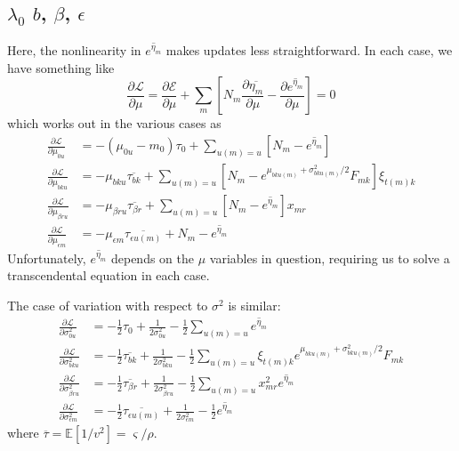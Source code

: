 \documentclass[11pt]{article}
\begin{document}
\subsection{$\lambda_0$ $b$, $\beta$, $\epsilon$}
Here, the nonlinearity in $\overline{e^{\eta_m}}$ makes updates less straightforward. In each case, we have something like
\begin{equation}
    \frac{\partial\mathcal{L}}{\partial \mu} = \frac{\partial\mathcal{E}}{\partial \mu} + \sum_{m} \left[N_{m} \frac{\partial\overline{\eta_{m}}}{\partial \mu} - \frac{\partial\overline{e^{\eta_{m}}}}{\partial \mu}\right] = 0
\end{equation}
which works out in the various cases as
\begin{align}
    \frac{\partial\mathcal{L}}{\partial \mu_{0u}} &= -(\mu_{0u} - m_0)\tau_0 + \sum_{u(m) = u} [N_{m} - \overline{e^{\eta_{m}}}] \\
    \frac{\partial\mathcal{L}}{\partial \mu_{bku}} &=
    - \mu_{bku} \overline{\tau_{bk}} + \sum_{u(m) = u} [N_{m} - e^{\mu_{bku(m)} + \sigma^2_{bku(m)} / 2} F_{mk} ] \xi_{t(m) k} \\
    \frac{\partial\mathcal{L}}{\partial \mu_{\beta ru}} &=
    - \mu_{\beta ru} \overline{\tau_{\beta r}} + \sum_{u(m) = u} [N_{m} - \overline{e^{\eta_{m}}}] x_{mr}  \\
    \frac{\partial\mathcal{L}}{\partial \mu_{\epsilon m}} &=
    - \mu_{\epsilon m} \overline{\tau_{\epsilon u(m)}} + N_{m} -
    \overline{e^{\eta_m}}
\end{align}
Unfortunately, $\overline{e^{\eta_m}}$ depends on the $\mu$ variables in question, requiring us to solve a transcendental equation in each case.

The case of variation with respect to $\sigma^2$ is similar:
\begin{align}
    \frac{\partial\mathcal{L}}{\partial \sigma^2_{0u}} &= -\frac{1}{2}\tau_0 + \frac{1}{2\sigma^2_{0u}} - \frac{1}{2} \sum_{u(m) = u} \overline{e^{\eta_m}} \\
    \frac{\partial\mathcal{L}}{\partial \sigma^2_{bku}} &=
    - \frac{1}{2} \overline{\tau_{bk}} + \frac{1}{2\sigma^2_{bku}} - \frac{1}{2}\sum_{u(m) = u} \xi_{t(m)k} e^{\mu_{bku(m)} + \sigma^2_{bku(m)} / 2} F_{mk}  \\
    \frac{\partial\mathcal{L}}{\partial \sigma^2_{\beta ru}} &=
    - \frac{1}{2} \overline{\tau_{\beta r}} + \frac{1}{2\sigma^2_{\beta ru}} - \frac{1}{2} \sum_{u(m) = u} x^2_{mr} \overline{e^{\eta_m}} \\
    \frac{\partial\mathcal{L}}{\partial \sigma^2_{\epsilon m}} &=
    -\frac{1}{2} \overline{\tau_{\epsilon u(m)}} + \frac{1}{2\sigma^2_{\epsilon m}} - \frac{1}{2} \overline{e^{\eta_m}}
\end{align}
where $\overline{\tau} = \mathbb{E}[1/v^2] = \varsigma / \rho$.
\end{document}
